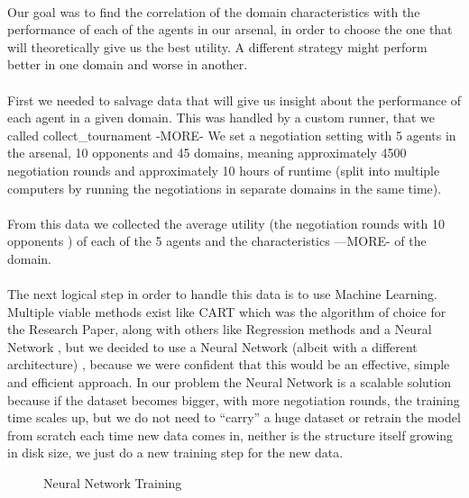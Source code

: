 \paragraph{}
Our goal was to find the correlation of the domain characteristics with the performance of each of the agents in our arsenal, in order to choose the one that will theoretically give us the best utility. 
A different strategy might perform better in one domain and worse in another.
\paragraph{}
 First we needed to salvage data that will give us insight about the performance of each agent in a given domain. 
 This was handled by a custom runner, that we called collect\_tournament -MORE- 
 We set a negotiation setting with 5 agents in the arsenal, 10 opponents and 45 domains, meaning approximately 4500 negotiation rounds and approximately
10 hours of runtime (split into multiple computers by running the negotiations in separate domains in the same time).
\paragraph{}
 From this data we collected the average utility (the negotiation rounds with 10 opponents ) of each of the 5 agents and the characteristics —MORE- of the domain.
\paragraph{}
 The next logical step in order to handle this data is to use Machine Learning. Multiple viable methods exist 
 like CART which was the algorithm of choice for the Research Paper, along with others like Regression methods and a Neural Network , 
 but we decided to use a Neural Network (albeit with a different architecture) , because we were confident that this would be an effective, simple and efficient approach. 
 In our problem the Neural Network 
 is a scalable solution because if the dataset becomes bigger, with more negotiation rounds, 
 the training time scales up, but we do not need to “carry” a huge dataset or retrain the model from scratch each time new data comes in, 
 neither is the structure itself growing in disk size, we just do a new training step for the new data.

\begin{figure}[H]
	\centering
	\captionsetup{justification=centering}
	\caption{Neural Network Training}
	\label{fig:Neural Network Training}
\end{figure}

